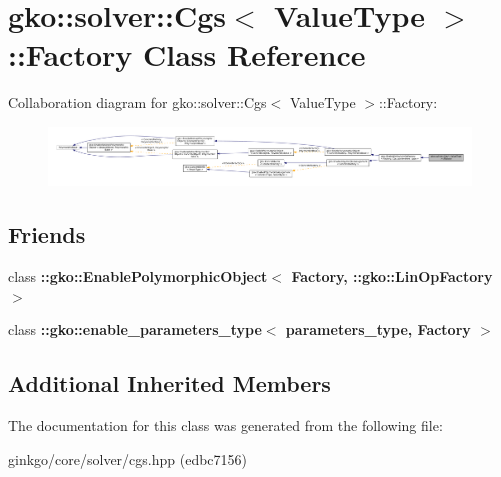 \hypertarget{classgko_1_1solver_1_1Cgs_1_1Factory}{}\section{gko\+:\+:solver\+:\+:Cgs$<$ Value\+Type $>$\+:\+:Factory Class Reference}
\label{classgko_1_1solver_1_1Cgs_1_1Factory}


Collaboration diagram for gko\+:\+:solver\+:\+:Cgs$<$ Value\+Type $>$\+:\+:Factory\+:
\nopagebreak
\begin{figure}[H]
\begin{center}
\leavevmode
\includegraphics[width=350pt]{classgko_1_1solver_1_1Cgs_1_1Factory__coll__graph}
\end{center}
\end{figure}
\subsection*{Friends}
\begin{DoxyCompactItemize}
\item 
\mbox{\label{classgko_1_1solver_1_1Cgs_1_1Factory_a27e9bbc94a1c1c59f40833153eda8f78}} 
class {\bfseries \+::gko\+::\+Enable\+Polymorphic\+Object$<$ Factory, \+::gko\+::\+Lin\+Op\+Factory $>$}
\item 
\mbox{\label{classgko_1_1solver_1_1Cgs_1_1Factory_a0d176cbd42d6214e11aee8c30ca256fc}} 
class {\bfseries \+::gko\+::enable\+\_\+parameters\+\_\+type$<$ parameters\+\_\+type, Factory $>$}
\end{DoxyCompactItemize}
\subsection*{Additional Inherited Members}


The documentation for this class was generated from the following file\+:\begin{DoxyCompactItemize}
\item 
ginkgo/core/solver/cgs.\+hpp (edbc7156)\end{DoxyCompactItemize}
